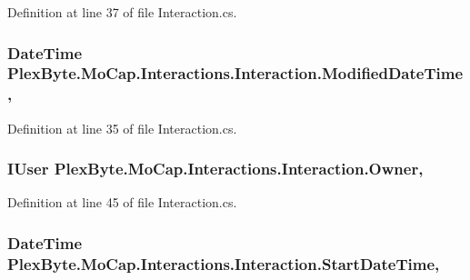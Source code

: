Definition at line 37 of file Interaction.\+cs.

\subsubsection[{\texorpdfstring{Modified\+Date\+Time}{ModifiedDateTime}}]{\setlength{\rightskip}{0pt plus 5cm}Date\+Time Plex\+Byte.\+Mo\+Cap.\+Interactions.\+Interaction.\+Modified\+Date\+Time\hspace{0.3cm}{\ttfamily [get]}, {\ttfamily [set]}}\hypertarget{class_plex_byte_1_1_mo_cap_1_1_interactions_1_1_interaction_ae0bf013e2937a5f9c958af23edb207a8}{}\label{class_plex_byte_1_1_mo_cap_1_1_interactions_1_1_interaction_ae0bf013e2937a5f9c958af23edb207a8}


Definition at line 35 of file Interaction.\+cs.

\subsubsection[{\texorpdfstring{Owner}{Owner}}]{\setlength{\rightskip}{0pt plus 5cm}I\+User Plex\+Byte.\+Mo\+Cap.\+Interactions.\+Interaction.\+Owner\hspace{0.3cm}{\ttfamily [get]}, {\ttfamily [set]}}\hypertarget{class_plex_byte_1_1_mo_cap_1_1_interactions_1_1_interaction_ae4c427e49c8dc9810bef3d951d00fb1c}{}\label{class_plex_byte_1_1_mo_cap_1_1_interactions_1_1_interaction_ae4c427e49c8dc9810bef3d951d00fb1c}


Definition at line 45 of file Interaction.\+cs.

\subsubsection[{\texorpdfstring{Start\+Date\+Time}{StartDateTime}}]{\setlength{\rightskip}{0pt plus 5cm}Date\+Time Plex\+Byte.\+Mo\+Cap.\+Interactions.\+Interaction.\+Start\+Date\+Time\hspace{0.3cm}{\ttfamily [get]}, {\ttfamily [set]}}\hypertarget{class_plex_byte_1_1_mo_cap_1_1_interactions_1_1_interaction_a01b90152f8f99c15751aee1b51d34a36}{}\label{class_plex_byte_1_1_mo_cap_1_1_interactions_1_1_interaction_a01b90152f8f99c15751aee1b51d34a36}


